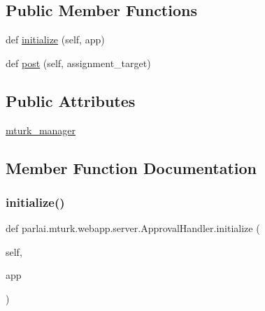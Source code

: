 \subsection*{Public Member Functions}
\begin{DoxyCompactItemize}
\item 
def \hyperlink{classparlai_1_1mturk_1_1webapp_1_1server_1_1ApprovalHandler_a3891a2146e72565874f18385dfc2c11e}{initialize} (self, app)
\item 
def \hyperlink{classparlai_1_1mturk_1_1webapp_1_1server_1_1ApprovalHandler_a94b2c2a69732dde8ea1e92a8b4f5f7ea}{post} (self, assignment\+\_\+target)
\end{DoxyCompactItemize}
\subsection*{Public Attributes}
\begin{DoxyCompactItemize}
\item 
\hyperlink{classparlai_1_1mturk_1_1webapp_1_1server_1_1ApprovalHandler_ac6cbcc9f89912ecbd3b9c677e44225b1}{mturk\+\_\+manager}
\end{DoxyCompactItemize}


\subsection{Member Function Documentation}
\mbox{\label{classparlai_1_1mturk_1_1webapp_1_1server_1_1ApprovalHandler_a3891a2146e72565874f18385dfc2c11e}} 
\subsubsection{\texorpdfstring{initialize()}{initialize()}}
{\footnotesize\ttfamily def parlai.\+mturk.\+webapp.\+server.\+Approval\+Handler.\+initialize (\begin{DoxyParamCaption}\item[{}]{self,  }\item[{}]{app }\end{DoxyParamCaption})}

\mbox{\label{classparlai_1_1mturk_1_1webapp_1_1server_1_1ApprovalHandler_a94b2c2a69732dde8ea1e92a8b4f5f7ea}} 
